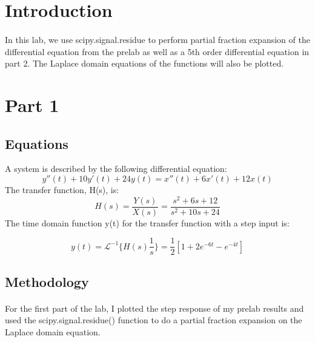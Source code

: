 \tableofcontents

\newpage
\section{Introduction}

\paragraph{}
In this lab, we use scipy.signal.residue to perform partial fraction expansion of the differential equation from the prelab as well as a 5th order differential equation in part 2.  The Laplace domain equations of the functions will also be plotted.



\section{Part 1}
\subsection{Equations}

A system is described by the following differential equation:
\[y''(t)+10y'(t)+24y(t)=x''(t)+6x'(t)+12x(t)\]
The transfer function, H(s), is:
\[H(s)=\dfrac{Y(s)}{X(s)}=\dfrac{s^{2}+6s+12}{s^{2}+10s+24}\]
The time domain function y(t) for the transfer function with a step input is:

 \[y(t)=\mathscr{L}^{-1}\{H(s)\frac{1}{s}\}=\frac{1}{2}[1+2e^{-6t}-e^{-4t}]\]

\subsection{Methodology}

\paragraph{}
For the first part of the lab, I plotted the step response of my prelab results and used the scipy.signal.residue() function to do a partial fraction expansion on the Laplace domain equation.


